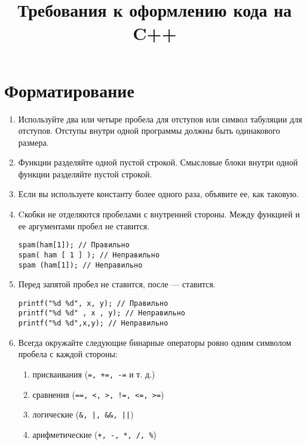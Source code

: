 \documentclass[10pt]{article}
\title{Требования к оформлению кода на C++}
\author{}
\date{}
\begin{document}
\maketitle

\section{Форматирование}

\begin{enumerate}

\item Используйте два или четыре пробела для отступов или символ табуляции для отступов. Отступы внутри одной программы должны быть одинакового размера.

\item Функции разделяйте одной пустой строкой. Смысловые блоки внутри одной функции разделяйте пустой строкой.

\item Если вы используете константу более одного раза, объявите ее, как таковую.

\item Cкобки не отделяются пробелами с внутренней стороны. Между функцией и ее аргументами пробел не ставится.

\begin{lstlisting}
spam(ham[1]); // Правильно
spam( ham [ 1 ] ); // Неправильно
spam (ham[1]); // Неправильно
\end{lstlisting}

\item Перед запятой пробел не ставится, после — ставится.

\begin{lstlisting}
printf("%d %d", x, y); // Правильно
printf("%d %d" , x , y); // Неправильно
printf("%d %d",x,y); // Неправильно
\end{lstlisting}

\item Всегда окружайте следующие бинарные операторы ровно одним символом пробела с каждой стороны:

\begin{enumerate}[1.]
	\item присваивания (\texttt{=, +=, -=} и т. д.)
	\item сравнения (\texttt{==, <, >, !=, <=, >=})
	\item логические (\texttt{\&, |, \&\&, ||})
	\item арифметические (\texttt{+, -, *, /, \%})
\end{enumerate}


\end{enumerate}
\end{document}
